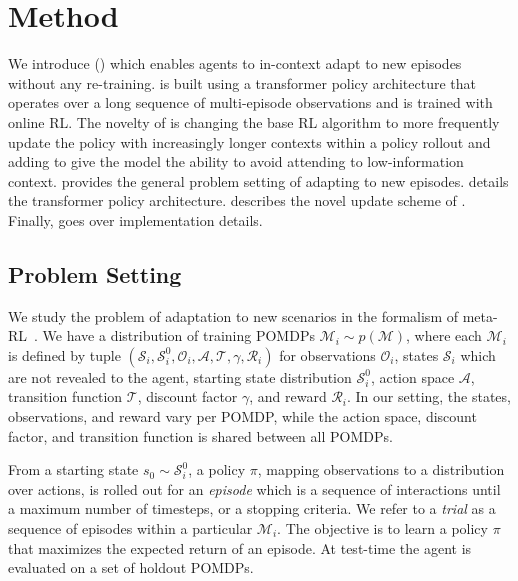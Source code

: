 
\vspace{-5pt}
\section{Method}
\vspace{-5pt}

We introduce \Method (\method) which enables agents to in-context adapt to new episodes without any re-training.
\method is built using a transformer policy architecture that operates over a long sequence of multi-episode observations and is trained with online RL. 
The novelty of \method is changing the base RL algorithm to more frequently update the policy with increasingly longer contexts within a policy rollout and adding \sinkv to give the model the ability to avoid attending to low-information context.
 provides the general problem setting of adapting to new episodes.
 details the transformer policy architecture.
 describes the novel update scheme of \method.
Finally,  goes over implementation details.

\subsection{Problem Setting}
\label{sec:problem} 
We study the problem of adaptation to new scenarios in the formalism of meta-RL~\citep{beck2023survey}. 
We have a distribution of training POMDPs $ \mathcal{M}_i \sim p(\mathcal{M})$, where each $ \mathcal{M}_i $ is defined by tuple $ \left( \mathcal{S}_i, \mathcal{S}_i^{0}, \mathcal{O}_i, \mathcal{A}, \mathcal{T}, \gamma, \mathcal{R}_i \right) $ for observations $ \mathcal{O}_i$, states $ \mathcal{S}_i$ which are not revealed to the agent, starting state distribution $ \mathcal{S}_i^{0}$, action space $ \mathcal{A}$, transition function $ \mathcal{T}$, discount factor $ \gamma$, and reward $ \mathcal{R}_i$. In our setting, the states, observations, and reward vary per POMDP, while the action space, discount factor, and transition function is shared between all POMDPs. 

From a starting state $ s_0 \sim \mathcal{S}_i^{0} $, a policy $ \pi$, mapping observations to a distribution over actions, is rolled out for an \emph{episode} which is a sequence of interactions until a maximum number of timesteps, or a stopping criteria. 
We refer to a \emph{trial} as a sequence of episodes within a particular $ \mathcal{M}_i$. The objective is to learn a policy $ \pi $ that maximizes the expected return of an episode.
At test-time the agent is evaluated on a set of holdout POMDPs. 

